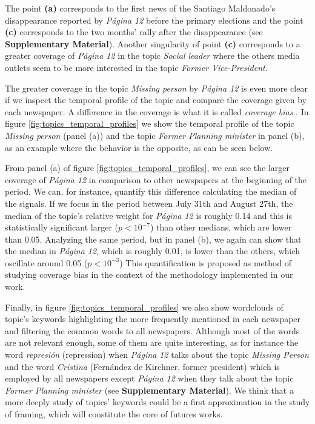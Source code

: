\documentclass{bmcart}
\begin{document}
\par The point \textbf{(a)} corresponds  to the first news of the Santiago Maldonado's disappearance  reported by \emph{P\'agina 12} before the primary elections and the point \textbf{(c)} corresponds to  the two months' rally after the disappearance  (see \textbf{Supplementary Material}). Another singularity of point \textbf{(c)} corresponds to a greater coverage of \emph{P\'agina 12} in the topic \emph{Social leader} where the others media outlets seem to be more interested in the topic \emph{Former Vice-President}.

\par The greater coverage in the topic \emph{Missing person} by \emph{P\'agina 12} is even more clear if we inspect the temporal profile of the topic and compare the coverage given by each newspaper. A difference in the coverage is what it is called \emph{coverage bias} \cite{dallmann2015media}.  In figure \ref{fig:topics_temporal_profiles} we show the temporal profile of the topic \emph{Missing person} (panel (a)) and the topic \emph{Former Planning minister} in panel (b), as an example where the behavior is the opposite, as can be seen below.

\par From panel (a) of figure \ref{fig:topics_temporal_profiles}, we can see the larger coverage of \emph{P\'agina 12} in comparison to other newspapers at the beginning of the period. We can, for instance, quantify this difference calculating  the median of the signals. If we focus in the period between July 31th and August 27th, the median of the topic's relative weight for \emph{P\'agina 12} is roughly 0.14 and this is statistically significant larger ($p < 10^{-7}$) than other medians, which are lower than 0.05.
Analyzing the same period, but in panel (b), we again can show that the median in \emph{P\'agina 12}, which is roughly 0.01, is lower than the others, which oscillate around 0.05 ($p<10^{-3}$)
This quantification is proposed as method of studying coverage bias in the context of the methodology implemented in our work. 

\par Finally, in figure \ref{fig:topics_temporal_profiles} we also show wordclouds of topic's keywords highlighting the more frequently mentioned in each newspaper and filtering the common words to all newspapers.
Although most of the words are not relevant enough, some of them are quite interesting, as for instance the word \emph{represi\'on} (repression) when \emph{P\'agina 12} talks about the topic \emph{Missing Person} and the word \emph{Cristina} (Fern\'andez de Kirchner, former president) which is employed by all newspapers except \emph{P\'agina 12} when they  talk about the topic \emph{Former Planning minister} (see \textbf{Supplementary Material}).
We think that a more deeply study of topics' keywords could be a first approximation in the study of framing, which will constitute the core of futures works.
\end{document}
